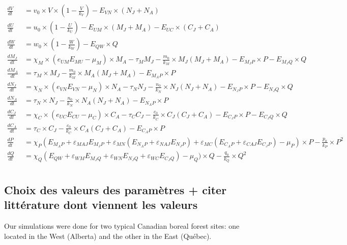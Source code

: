 \begin{equation}
\begin{split}
\label{eq:ens_equations}
	\frac{dV}{dt} &= v_0\times V \times (1-\frac{V}{k_V}) - E_{VN} \times (N_J + N_A) \\
	\frac{dU}{dt} &= u_0 \times (1 - \frac{U}{k_U}) - E_{UM} \times (M_J + M_A) - E_{UC} \times (C_J + C_A)\\
	\frac{dW}{dt} &= w_0 \times (1 - \frac{W}{k_W}) - E_{QW} \times Q\\
	\frac{dM_J}{dt} &= \chi_M \times (e_{UM}E_{MU} - \mu_M) \times M_A - \tau_M M_J - \frac{m_0}{k_M} \times M_J(M_J + M_A) - E_{M_{J}P} \times P - E_{M_{J}Q} \times Q \\ 
	\frac{dM_{A}}{dt} &= \tau_M \times M_J - \frac{m_0}{k_M} \times M_A(M_J + M_A) - E_{M_{A}P} \times P \\
	\frac{dN_J}{dt} &= \chi_N \times (e_{VN}E_{VN} - \mu_N) \times N_A - \tau_N N_J - \frac{n_0}{k_N} \times N_J(N_J + N_A) - E_{N_{J}P} \times P - E_{N_{J}Q} \times Q \\
	\frac{dN_{A}}{dt} &= \tau_N \times N_J - \frac{n_0}{k_N} \times N_A(N_J + N_A) - E_{N_{A}P} \times P \\
	\frac{dC_J}{dt} &= \chi_C \times (e_{UC}E_{CU} - \mu_C) \times C_A - \tau_C C_J - \frac{c_0}{k_C} \times C_J(C_J + C_A) - E_{C_{J}P} \times P - E_{C_{J}Q} \times Q\\
	\frac{dC_{A}}{dt} &= \tau_C \times C_J - \frac{c_0}{k_C} \times C_A(C_J + C_A) - E_{C_{A}P} \times P \\
	\frac{dP}{dt} &= \chi_P(E_{M_{A}P} + \varepsilon_{MAJ}E_{M_{J}P} + \varepsilon_{MN}(E_{N_{A}P} + \varepsilon_{NAJ}E_{N_{J}P}) +\varepsilon_{MC}(E_{C_{A}P}+\varepsilon_{CAJ}E_{C_{J}P})-\mu_P) \times P - \frac{p_0}{k_P} \times P^2 \\
	\frac{dQ}{dt} &= \chi_Q(E_{QW} + \varepsilon_{WM}E_{M_{J}Q} + \varepsilon_{WN}E_{N_{J}Q} + \varepsilon_{WC}E_{C_{J}Q})-\mu_Q) \times Q - \frac{q_0}{k_Q} \times Q^2 \\
\end{split}
\end{equation}


\subsection{Choix des valeurs des paramètres + citer littérature dont viennent les valeurs}
Our simulations were done for two typical Canadian boreal forest sites: one located in the West (Alberta) and the other in the East (Québec). 


